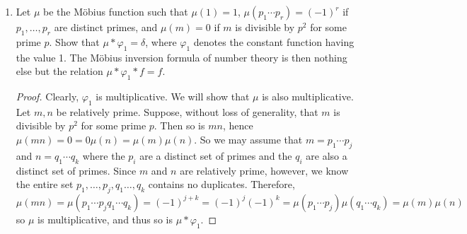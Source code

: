 \documentclass[10pt]{article}
\begin{document}
\begin{enumerate}
\begin{enumerate}
\begin{proof}
Suppose $f$ and $g$ are multiplicative, and let $m,n \in P$ be relatively prime.  Then
\begin{align}
(f*g)(mn) &= \sum_{xy=mn} f(x)g(y) \\
&= \sum_{x | mn} f(x) g \left( \frac{mn}{x} \right) \\
&= \sum_{a | m} \sum_{b | n} f(ab) g\left( \frac{mn}{ab} \right) \\
&= \sum_{a | m} \sum_{b | n} f(a)f(b) g\left( \frac{m}{a} \right)g\left( \frac{n}{b} \right)\\
&= \sum_{a | m} f(a) g\left( \frac{m}{a} \right) \sum_{b | n} f(b) g\left( \frac{n}{b} \right) \\
&= \sum_{xy=m} f(x) g\left( y \right) \sum_{xy= n} f(x) g\left(y \right) \\
&= (f*g)(m) \cdot (f*g)(n).
\end{align}
A brief explanation: the step from line (2) to line (3) happens because $m$ and $n$ are relatively prime, thus $\{x \mid mn\} = \{ab : a \mid m, b \mid n\}$.  On line (4), we know that $a$ and $b$ are relatively prime because $a$ is a divisor of $m$ and $b$ of $n$, so $f(ab) = f(a)f(b)$.  The same logic applies to $\frac{m}{a}$ and $\frac{n}{b}$, so that $g$ distributes over their product.  Therefore, $f*g$ is multiplicative if $f$ and $g$ are.
\end{proof}

\item Let $\mu$ be the M\"obius function such that $\mu(1) = 1$, $\mu(p_1 \cdots p_r) = (-1)^r$ if $p_1, \dots , p_r$ are distinct primes, and $\mu(m)=0$ if $m$ is divisible by $p^2$ for some prime $p$.  Show that $\mu * \varphi_1 = \delta$, where $\varphi_1$ denotes the constant function having the value 1.  The M\"obius inversion formula of number theory is then nothing else but the relation $\mu * \varphi_1 * f = f$.

\begin{proof}
Clearly, $\varphi_1$ is multiplicative.  We will show that $\mu$ is also multiplicative.  Let $m,n$ be relatively prime.  Suppose, without loss of generality, that $m$ is divisible by $p^2$ for some prime $p$.  Then so is $mn$, hence $\mu(mn) = 0 = 0\mu(n) = \mu(m)\mu(n)$.  So we may assume that $m = p_1 \cdots p_j$ and $n = q_1 \cdots q_k$ where the $p_i$ are a distinct set of primes and the $q_i$ are also a distinct set of primes.  Since $m$ and $n$ are relatively prime, however, we know the entire set $p_1 , \dots , p_j, q_1 \dots , q_k$ contains no duplicates.  Therefore,
$$
\mu(mn) = \mu(p_1 \cdots p_j q_1 \cdots q_k) = (-1)^{j+k} = (-1)^j(-1)^k = \mu(p_1 \cdots p_j) \mu(q_1 \cdots q_k) = \mu(m)\mu(n)
$$
so $\mu$ is multiplicative, and thus so is $\mu * \varphi_1$.


\end{proof}
\end{enumerate}
\end{enumerate}
\end{document}
